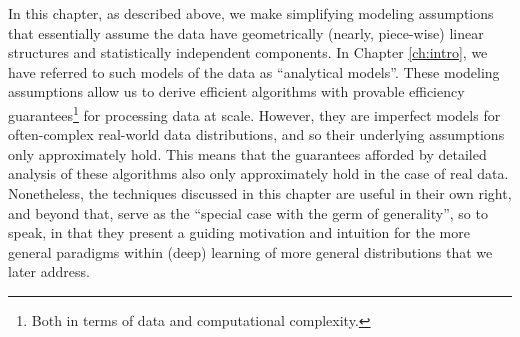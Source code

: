 \documentclass[../../book-main.tex]{subfiles}
\begin{document}
In this chapter, as described above, we make simplifying modeling assumptions that essentially assume the data have geometrically (nearly, piece-wise) linear structures and statistically independent components. In Chapter \ref{ch:intro}, we have referred to such models of the data as ``analytical models''. These modeling assumptions allow us to derive efficient algorithms with provable efficiency guarantees\footnote{Both in terms of data and computational complexity.} for processing data at scale. However, they are imperfect models for often-complex real-world data distributions, and so their underlying assumptions only approximately hold. This means that the guarantees afforded by detailed analysis of these algorithms also only approximately hold in the case of real data. Nonetheless, the techniques discussed in this chapter are useful in their own right, and beyond that, serve as the ``special case with the germ of generality'', so to speak, in that they present a guiding motivation and intuition for the more general paradigms within (deep)  learning of more general distributions that we later address. %



\end{document}
